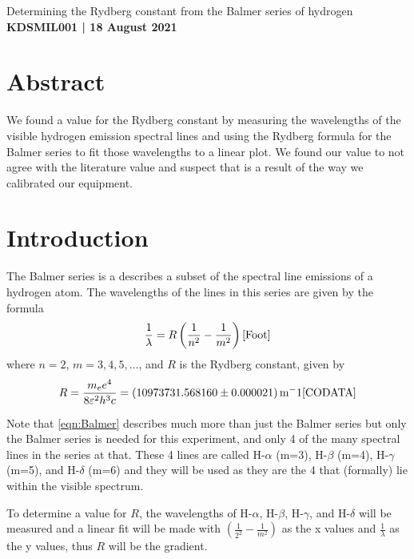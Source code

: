\documentclass[11pt]{article}
\numberwithin{equation}{section}
\numberwithin{figure}{section}
\numberwithin{table}{section}
\begin{document}
\begin{center}
    {\huge Determining the Rydberg constant from the Balmer series of hydrogen}\\
    \vspace{0.2in}
    \textbf{KDSMIL001 | 18 August 2021}
    
    
    \section*{Abstract}\label{sec:Abstract}
    We found a value for the Rydberg constant by measuring the wavelengths of the visible hydrogen emission spectral lines and using the Rydberg formula for the Balmer series to fit those wavelengths to a linear plot. We found our value to not agree with the literature value and suspect that is a result of the way we calibrated our equipment.
\end{center}
    
\section{Introduction}\label{sec:Introduction}
\par The Balmer series is a describes a subset of the spectral line emissions of a hydrogen atom. The wavelengths of the lines in this series are given by the formula
\begin{equation}
    \frac{1}{\lambda}=R\left(\frac{1}{n^2}-\frac{1}{m^2}\right)\cite{Foot}
    \label{eqn:Balmer}
\end{equation}
where $n=2$, $m=3,4,5,\dots$, and $R$ is the Rydberg constant, given by
\begin{equation}
    R=\frac{m_ee^4}{8\varepsilon^2h^3c}=\SI{10973731.568160(21)}{\metre^-1}\cite{CODATA}
    \label{eqn:Rydberg Constant}
\end{equation}
\par Note that \autoref{eqn:Balmer} describes much more than just the Balmer series but only the Balmer series is needed for this experiment, and only 4 of the many spectral lines in the series at that. These 4 lines are called H-$\alpha$ (m=3), H-$\beta$ (m=4), H-$\gamma$ (m=5), and H-$\delta$ (m=6) and they will be used as they are the 4 that (formally) lie within the visible spectrum.
\par To determine a value for $R$, the wavelengths of H-$\alpha$, H-$\beta$, H-$\gamma$, and H-$\delta$ will be measured and a linear fit will be made with $\left(\frac{1}{2^2}-\frac{1}{m^2}\right)$ as the x values and $\frac{1}{\lambda}$ as the y values, thus $R$ will be the gradient.
\end{document}
